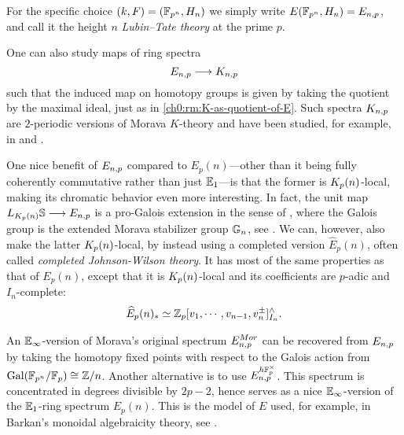 

\begin{definition}
    For the specific choice $(k,F) = (\mathbb{F}_{p^n}, H_n)$ we simply write $E(\mathbb{F}_{p^n}, H_n) = E_{n,p}$, and call it the height $n$ \emph{Lubin--Tate theory} at the prime $p$. 
\end{definition}

\begin{remark}
    One can also study maps of ring spectra 
    \[E_{n,p} \longrightarrow K_{n,p}\] 
    such that the induced map on homotopy groups is given by taking the quotient by the maximal ideal, just as in \cref{ch0:rm:K-as-quotient-of-E}. Such spectra $K_{n,p}$ are $2$-periodic versions of Morava $K$-theory and have been studied, for example, in \cite{hopkins-lurie_17} and \cite{barthel-pstragowski_2021}. 
\end{remark}

\begin{remark}
    One nice benefit of $E_{n,p}$ compared to $E_p(n)$---other than it being fully coherently commutative rather than just $\mathbb{E}_1$---is that the former is ${K_p(n)}$-local, making its chromatic behavior even more interesting. In fact, the unit map $L_{{K_p(n)}}\mathbb{S} \longrightarrow E_{n,p}$ is a pro-Galois extension in the sense of \cite{rognes_08}, where the Galois group is the extended Morava stabilizer group $\mathbb{G}_n$, see \cite{devinatz-hopkins_2004}. We can, however, also make the latter ${K_p(n)}$-local, by instead using a completed version $\widehat{E}_p(n)$, often called \emph{completed Johnson-Wilson theory}. It has most of the same properties as that of $E_p(n)$, except that it is ${K_p(n)}$-local and its coefficients are $p$-adic and $I_n$-complete: 
    \[\widehat{E}_p(n)_* \simeq \mathbb{Z}_p[v_1, \cdots, v_{n-1}, v_n^{\pm}]^\wedge_{I_n}.\]
\end{remark}

\begin{remark}
    An $\mathbb{E}_\infty$-version of Morava's original spectrum $E_{n,p}^{Mor}$ can be recovered from $E_{n,p}$ by taking the homotopy fixed points with respect to the Galois action from $\mathrm{Gal}(\mathbb{F}_{p^n}/\mathbb{F}_p)\cong \mathbb{Z}/n$. Another alternative is to use $E_{n,p}^{h\mathbb{F}_p^\times}$. This spectrum is concentrated in degrees divisible by $2p-2$, hence serves as a nice $\mathbb{E}_\infty$-version of the $\mathbb{E}_1$-ring spectrum $E_p(n)$. This is the model of $E$ used, for example, in Barkan's monoidal algebraicity theory, see \cite{barkan_2023}. 
\end{remark}

